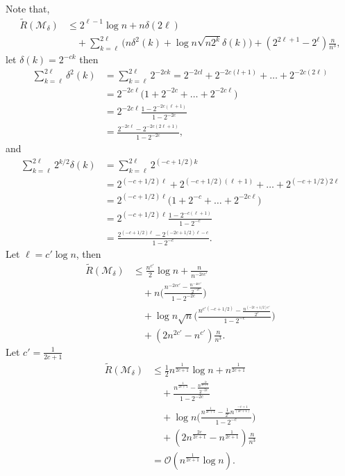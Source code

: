 \documentclass[conference,a4paper]{article}
\begin{document}
\Proof
Note that, 
\begin{align*}
\tilde{R}(\mathcal{M}_\delta)
&\leq 
	2^{\ell-1}\log n
+n\delta(2\ell)\\
&\quad+\sum_{k=\ell}^{2\ell}\big(n\delta^2(k)+\log n\sqrt{n2^k}\delta(k)\big)
	+(2^{2\ell+1}-2^\ell)\frac{n}{n^3},
\end{align*}
let $\delta(k)=2^{-ck}$ then
\begin{align*}
\sum_{k=\ell}^{2\ell}\delta^2(k)
&=\sum_{k=\ell}^{2\ell} 2^{-2ck}=2^{-2cl}+2^{-2c(l+1)}+\dots+2^{-2c(2\ell)}\\
&=2^{-2c\ell}\big(1+2^{-2c}+\dots+2^{-2c\ell}\big)\\
&=2^{-2c\ell}\frac{1-2^{-2c(\ell+1)}}{1-2^{-2c}}\\
&=\frac{2^{-2c\ell}-2^{-2c(2\ell+1)}}{1-2^{-2c}},
\end{align*}
and
\begin{align*}
\sum_{k=\ell}^{2\ell}2^{k/2}\delta(k)
&=\sum_{k=\ell}^{2\ell} 2^{(-c+1/2)k}\\
&=2^{(-c+1/2)\ell}+2^{(-c+1/2)(\ell+1)}+\dots+2^{(-c+1/2)2\ell}\\
&=2^{(-c+1/2)\ell}\big(1+2^{-c}+\dots+2^{-2c\ell}\big)\\
&=2^{(-c+1/2)\ell}\frac{1-2^{-c(\ell+1)}}{1-2^{-c}}\\
&=\frac{2^{(-c+1/2)\ell}-2^{(-2c+1/2)\ell-c}}{1-2^{-c}}.
\end{align*}
Let $\ell=c'\log n$, then
\begin{align*}
\tilde{R}(\mathcal{M}_\delta)
&\leq
\frac{n^{c'}}{2}\log n
+\frac{n}{n^{-2cc'}}\\
&\quad+n\bigg(\frac{n^{-2cc'}-\frac{n^{-4cc'}}{2^{-2c}}}{1-2^{-2c}}\bigg)\\
&\quad+\log n\sqrt{n}\bigg(\frac{n^{c'(-c+1/2)}-\frac{n^{(-2c+1/2)c'}}{2^c}}{1-2^{-c}}\bigg)\\
&\quad+(2n^{2c'}-n^{c'})\frac{n}{n^3}.
\end{align*}
Let $c'=\frac{1}{2c+1}$
\begin{align*}
\tilde{R}(\mathcal{M}_\delta)
&\leq
\frac1{2}n^{\frac{1}{2c+1}}\log n
+n^{\frac{1}{2c+1}}\\
&\quad+\frac{n^{\frac{1}{2c+1}}-\frac{n^{\frac{-2c}{2c+1}}}{2^{-2c}}}{1-2^{-2c}}\\
&\quad+\log n\bigg(\frac{n^{\frac{1}{2c+1}}-\frac1{2^c}n^{\frac{-c+1}{(2c+1)}}}{1-2^{-c}}\bigg)\\
&\quad+(2n^{\frac{2c}{2c+1}}-n^{\frac{1}{2c+1}})\frac{n}{n^3}\\
&=\mathcal{O}(n^{\frac{1}{2c+1}}\log n).
\end{align*}
\eCorollary
\end{document}
